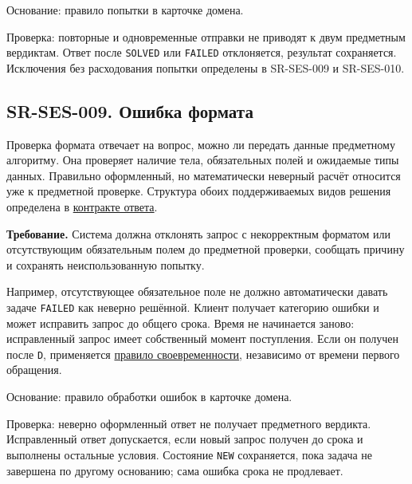 \documentclass[12pt,a4paper]{article}
\begin{document}
Основание: правило попытки в карточке домена.

Проверка: повторные и одновременные отправки не приводят к двум предметным вердиктам. Ответ после \texttt{SOLVED} или \texttt{FAILED} отклоняется, результат сохраняется. Исключения без расходования попытки определены в SR-SES-009 и SR-SES-010.

\subsection{SR-SES-009. Ошибка формата}\label{sr-ses-009-ux43eux448ux438ux431ux43aux430-ux444ux43eux440ux43cux430ux442ux430}

\hypertarget{sr-ses-009-ошибка-формата}{}

Проверка формата отвечает на вопрос, можно ли передать данные предметному алгоритму. Она проверяет наличие тела, обязательных полей и ожидаемые типы данных. Правильно оформленный, но математически неверный расчёт относится уже к предметной проверке. Структура обоих поддерживаемых видов решения определена в \href{../07_\%D0\%9F\%D1\%80\%D0\%BE\%D0\%B3\%D1\%80\%D0\%B0\%D0\%BC\%D0\%BC\%D0\%BD\%D1\%8B\%D0\%B5_\%D1\%82\%D1\%80\%D0\%B5\%D0\%B1\%D0\%BE\%D0\%B2\%D0\%B0\%D0\%BD\%D0\%B8\%D1\%8F/DOC-06.2_\%D0\%A1\%D0\%B5\%D1\%81\%D1\%81\%D0\%B8\%D0\%B8_\%D0\%B7\%D0\%B0\%D0\%B4\%D0\%B0\%D1\%87_\%D0\%B8_\%D0\%BF\%D0\%BB\%D0\%B0\%D0\%BD\%D0\%B8\%D1\%80\%D0\%BE\%D0\%B2\%D1\%89\%D0\%B8\%D0\%BA.pdf\#nameddest=\%D0\%BF\%D1\%80\%D0\%B5\%D0\%B4\%D0\%BC\%D0\%B5\%D1\%82\%D0\%BD\%D1\%8B\%D0\%B9-\%D0\%BE\%D1\%82\%D0\%B2\%D0\%B5\%D1\%82}{контракте ответа}.

\textbf{Требование.} Система должна отклонять запрос с некорректным форматом или отсутствующим обязательным полем до предметной проверки, сообщать причину и сохранять неиспользованную попытку.

Например, отсутствующее обязательное поле не должно автоматически давать задаче \texttt{FAILED} как неверно решённой. Клиент получает категорию ошибки и может исправить запрос до общего срока. Время не начинается заново: исправленный запрос имеет собственный момент поступления. Если он получен после \texttt{D}, применяется \hyperref[sr-ses-011-ux43cux43eux43cux435ux43dux442-ux43fux440ux438ux451ux43cux430-ux43eux442ux432ux435ux442ux430]{правило своевременности}, независимо от времени первого обращения.

Основание: правило обработки ошибок в карточке домена.

Проверка: неверно оформленный ответ не получает предметного вердикта. Исправленный ответ допускается, если новый запрос получен до срока и выполнены остальные условия. Состояние \texttt{NEW} сохраняется, пока задача не завершена по другому основанию; сама ошибка срока не продлевает.
\end{document}
